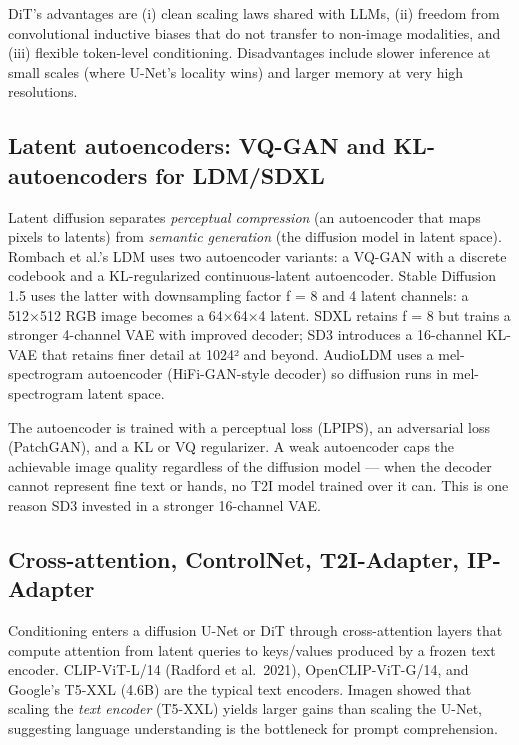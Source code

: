 \documentclass{article}
\begin{document}
DiT's advantages are (i) clean scaling laws shared with LLMs, (ii) freedom from convolutional inductive biases that do not transfer to non-image modalities, and (iii) flexible token-level conditioning. Disadvantages include slower inference at small scales (where U-Net's locality wins) and larger memory at very high resolutions.

\subsection{Latent autoencoders: VQ-GAN and KL-autoencoders for LDM/SDXL}\label{latent-autoencoders-vq-gan-and-kl-autoencoders-for-ldmsdxl}

Latent diffusion separates \emph{perceptual compression} (an autoencoder that maps pixels to latents) from \emph{semantic generation} (the diffusion model in latent space). Rombach et al.'s LDM uses two autoencoder variants: a VQ-GAN with a discrete codebook and a KL-regularized continuous-latent autoencoder. Stable Diffusion 1.5 uses the latter with downsampling factor f = 8 and 4 latent channels: a 512×512 RGB image becomes a 64×64×4 latent. SDXL retains f = 8 but trains a stronger 4-channel VAE with improved decoder; SD3 introduces a 16-channel KL-VAE that retains finer detail at 1024² and beyond. AudioLDM uses a mel-spectrogram autoencoder (HiFi-GAN-style decoder) so diffusion runs in mel-spectrogram latent space.

The autoencoder is trained with a perceptual loss (LPIPS), an adversarial loss (PatchGAN), and a KL or VQ regularizer. A weak autoencoder caps the achievable image quality regardless of the diffusion model --- when the decoder cannot represent fine text or hands, no T2I model trained over it can. This is one reason SD3 invested in a stronger 16-channel VAE.

\subsection{Cross-attention, ControlNet, T2I-Adapter, IP-Adapter}\label{cross-attention-controlnet-t2i-adapter-ip-adapter}

Conditioning enters a diffusion U-Net or DiT through cross-attention layers that compute attention from latent queries to keys/values produced by a frozen text encoder. CLIP-ViT-L/14 (Radford et al.~2021), OpenCLIP-ViT-G/14, and Google's T5-XXL (4.6B) are the typical text encoders. Imagen showed that scaling the \emph{text encoder} (T5-XXL) yields larger gains than scaling the U-Net, suggesting language understanding is the bottleneck for prompt comprehension.
\end{document}
